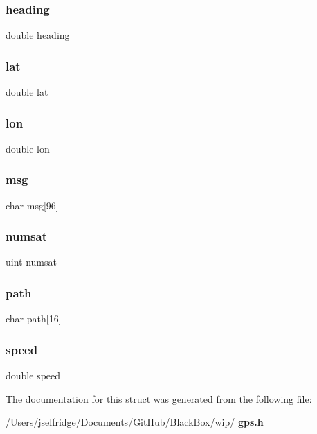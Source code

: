 \subsubsection{heading}
{\footnotesize\ttfamily double heading}

\mbox{\label{structgps__struct_a7972334534f68166121a6e51b0aac2d6}} 
\subsubsection{lat}
{\footnotesize\ttfamily double lat}

\mbox{\label{structgps__struct_aa96391e04b5977c50b96d77bea86a01d}} 
\subsubsection{lon}
{\footnotesize\ttfamily double lon}

\mbox{\label{structgps__struct_a44d19fa5c6295b651cd0c401ecc65db2}} 
\subsubsection{msg}
{\footnotesize\ttfamily char msg[96]}

\mbox{\label{structgps__struct_a4589ae60f04e922cdabb27e09afb878b}} 
\subsubsection{numsat}
{\footnotesize\ttfamily uint numsat}

\mbox{\label{structgps__struct_ace45f567511d3f9ff978c679ae38b5b0}} 
\subsubsection{path}
{\footnotesize\ttfamily char path[16]}

\mbox{\label{structgps__struct_a6dc6e6f3c75c509ce943163afb5dade7}} 
\subsubsection{speed}
{\footnotesize\ttfamily double speed}



The documentation for this struct was generated from the following file\+:\begin{DoxyCompactItemize}
\item 
/\+Users/jselfridge/\+Documents/\+Git\+Hub/\+Black\+Box/wip/\textbf{ gps.\+h}\end{DoxyCompactItemize}

